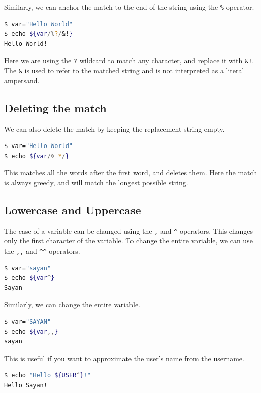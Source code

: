 Similarly, we can anchor the match to the end of the string using the \lstinline{%} operator.

\begin{lstlisting}[language=bash]
$ var="Hello World"
$ echo ${var/%?/&!}
Hello World!
\end{lstlisting}

Here we are using the \lstinline{?} wildcard to match any character, and replace it with \lstinline{&!}.
The \lstinline{&} is used to refer to the matched string and is not interpreted as a literal ampersand.

\subsection{Deleting the match}

We can also delete the match by keeping the replacement string empty.

\begin{lstlisting}[language=bash]
$ var="Hello World"
$ echo ${var/% */}
\end{lstlisting}

This matches all the words after the first word, and deletes them.
Here the match is always greedy, and will match the longest possible string.

\subsection{Lowercase and Uppercase}

The case of a variable can be changed using the \lstinline{,} and \lstinline{^} operators.
This changes only the first character of the variable.
To change the entire variable, we can use the \lstinline{,,} and \lstinline{^^} operators.

\begin{lstlisting}[language=bash]
$ var="sayan"
$ echo ${var^}
Sayan
\end{lstlisting}

Similarly, we can change the entire variable.

\begin{lstlisting}[language=bash]
$ var="SAYAN"
$ echo ${var,,}
sayan
\end{lstlisting}

This is useful if you want to approximate the user's name from the username.

\begin{lstlisting}[language=bash]
$ echo "Hello ${USER^}!"
Hello Sayan!
\end{lstlisting}

